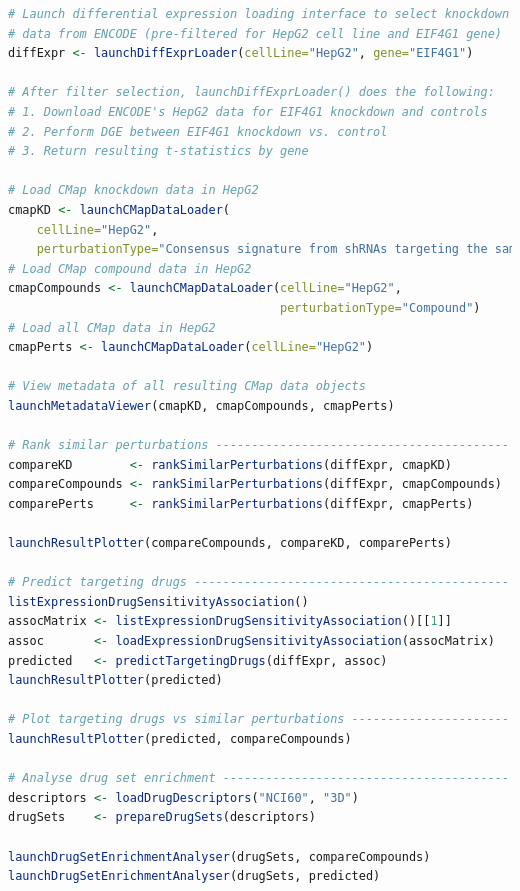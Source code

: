 \begin{lstlisting}[caption=Calling cTRAP's graphical interface functions in an R script.,label={lst:cTRAP-graphical},language=R,morekeywords={include, launchDiffExprLoader},keywordstyle=\bfseries]
# Launch differential expression loading interface to select knockdown
# data from ENCODE (pre-filtered for HepG2 cell line and EIF4G1 gene)
diffExpr <- launchDiffExprLoader(cellLine="HepG2", gene="EIF4G1")

# After filter selection, launchDiffExprLoader() does the following:
# 1. Download ENCODE's HepG2 data for EIF4G1 knockdown and controls
# 2. Perform DGE between EIF4G1 knockdown vs. control
# 3. Return resulting t-statistics by gene

# Load CMap knockdown data in HepG2
cmapKD <- launchCMapDataLoader(
    cellLine="HepG2",
    perturbationType="Consensus signature from shRNAs targeting the same gene")
# Load CMap compound data in HepG2
cmapCompounds <- launchCMapDataLoader(cellLine="HepG2",
                                      perturbationType="Compound")
# Load all CMap data in HepG2
cmapPerts <- launchCMapDataLoader(cellLine="HepG2")

# View metadata of all resulting CMap data objects
launchMetadataViewer(cmapKD, cmapCompounds, cmapPerts)

# Rank similar perturbations -----------------------------------------
compareKD        <- rankSimilarPerturbations(diffExpr, cmapKD)
compareCompounds <- rankSimilarPerturbations(diffExpr, cmapCompounds)
comparePerts     <- rankSimilarPerturbations(diffExpr, cmapPerts)

launchResultPlotter(compareCompounds, compareKD, comparePerts)

# Predict targeting drugs --------------------------------------------
listExpressionDrugSensitivityAssociation()
assocMatrix <- listExpressionDrugSensitivityAssociation()[[1]]
assoc       <- loadExpressionDrugSensitivityAssociation(assocMatrix)
predicted   <- predictTargetingDrugs(diffExpr, assoc)
launchResultPlotter(predicted)

# Plot targeting drugs vs similar perturbations ----------------------
launchResultPlotter(predicted, compareCompounds)

# Analyse drug set enrichment ----------------------------------------
descriptors <- loadDrugDescriptors("NCI60", "3D")
drugSets    <- prepareDrugSets(descriptors)

launchDrugSetEnrichmentAnalyser(drugSets, compareCompounds)
launchDrugSetEnrichmentAnalyser(drugSets, predicted)
\end{lstlisting}

